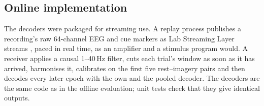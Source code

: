 \documentclass[11pt]{article}
\begin{document}
\subsection{Online implementation}
\label{sec:online-method}

The decoders were packaged for streaming use. A replay process publishes a recording's raw 64-channel EEG and cue markers as Lab Streaming Layer streams \citep{kothe2025}, paced in real time, as an amplifier and a stimulus program would. A receiver applies a causal 1--40\,Hz filter, cuts each trial's window as soon as it has arrived, harmonises it, calibrates on the first five rest--imagery pairs and then decodes every later epoch with the own and the pooled decoder. The decoders are the same code as in the offline evaluation; unit tests check that they give identical outputs.





\end{document}
